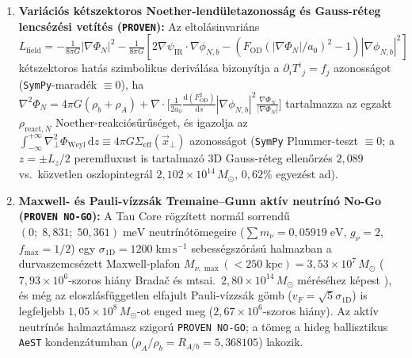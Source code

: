 \documentclass[11pt,a4paper]{article}
\begin{document}
\begin{enumerate}
    \item \textbf{Variációs kétszektoros Noether-lendületazonosság és Gauss-réteg lencsézési vetítés (\texttt{PROVEN}):} Az eltolásinvariáns $L_{\mathrm{field}} = -\frac{1}{8\pi G}|\nabla\Phi_N|^2 - \frac{1}{8\pi G}[2\nabla\psi_{\mathrm{IR}}\cdot\nabla\phi_{N,b} - (F_{\mathrm{OD}}(|\nabla\Phi_N|/a_0)^2 - 1)|\nabla\phi_{N,b}|^2]$ kétszektoros hatás szimbolikus deriválása bizonyítja a $\partial_i T^i{}_j = f_j$ azonosságot (\texttt{SymPy}-maradék $\equiv 0$), ha $\nabla^2\Phi_N = 4\pi G(\rho_b + \rho_A) + \nabla\cdot\bigl[\frac{1}{2a_0}\frac{\mathrm{d}(F_{\mathrm{OD}}^2)}{\mathrm{d}s}|\nabla\phi_{N,b}|^2\frac{\nabla\Phi_N}{|\nabla\Phi_N|}\bigr]$ tartalmazza az egzakt $\rho_{\mathrm{react},N}$ Noether-reakciósűrűséget, és igazolja az $\int_{-\infty}^{+\infty}\nabla_\perp^2\Phi_{\mathrm{Weyl}}\,\mathrm{d}z \equiv 4\pi G\Sigma_{\mathrm{eff}}(\vec{x}_\perp)$ azonosságot (\texttt{SymPy} Plummer-teszt $\equiv 0$; a $z = \pm L_z/2$ peremfluxust is tartalmazó 3D Gauss-réteg ellenőrzés $2{,}089$ vs.\ közvetlen oszlopintegrál $2{,}102\times 10^{14}\,M_\odot$, $0{,}62\%$ egyezést ad).
    \item \textbf{Maxwell- és Pauli-vízzsák Tremaine--Gunn aktív neutrínó No-Go (\texttt{PROVEN NO-GO}):} A Tau Core rögzített normál sorrendű $(0;\; 8{,}831;\; 50{,}361)\;\mathrm{meV}$ neutrínótömegeire ($\sum m_\nu = 0{,}05919\;\mathrm{eV}$, $g_\nu = 2$, $f_{\max} = 1/2$) egy $\sigma_{1\mathrm{D}} = 1200\;\mathrm{km\,s^{-1}}$ sebességszórású halmazban a durvaszemcsézett Maxwell-plafon $M_{\nu,\max}(<250\;\mathrm{kpc}) = 3{,}53\times 10^7\,M_\odot$ ($7{,}93\times 10^6$-szoros hiány Brada\v{c} és mtsai.\ $2{,}80\times 10^{14}\,M_\odot$ méréséhez képest \cite{Bradac2006}), és még az eloszlásfüggetlen elfajult Pauli-vízzsák gömb ($v_F = \sqrt{5}\sigma_{1\mathrm{D}}$) is legfeljebb $1{,}05\times 10^8\,M_\odot$-ot enged meg ($2{,}67\times 10^6$-szoros hiány). Az aktív neutrínós halmaztámasz szigorú \texttt{PROVEN NO-GO}; a tömeg a hideg ballisztikus \texttt{AeST} kondenzátumban ($\rho_A/\rho_b = R_{A/b} = 5{,}368105$) lakozik.
\end{enumerate}
\end{document}
